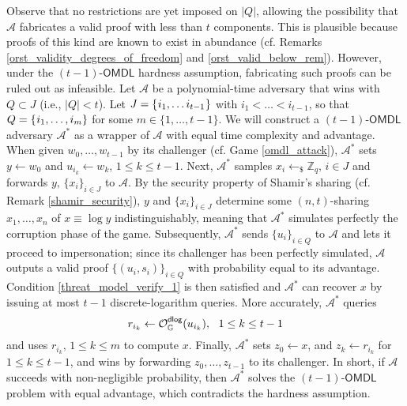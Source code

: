 \documentclass[psamsfonts, reqno]{amsart}
\theoremstyle{definition}
\theoremstyle{remark}
\numberwithin{equation}{section}
\begin{document}
Observe that no restrictions are yet imposed on $|Q|$,
allowing the possibility that $\mathcal{A}$ fabricates
a valid proof with less than $t$ components.
This is plausible because proofs of this kind
are known to exist in abundance
(cf. Remarks \ref{orst_validity_degrees_of_freedom}
and \ref{orst_valid_below_rem}).
However, under the $(t-1)$-$\mathsf{OMDL}$ hardness assumption,
fabricating such proofs can be ruled out as infeasible.
Let $\mathcal{A}$ be a polynomial-time adversary
that wins with $Q \subset J$ (i.e., $|Q| < t$).
Let $J = \{\hspace{0.5pt}i_1, \dots i_{t-1}\hspace{0.5pt}\}$
with $i_1 < \dots < i_{t-1}$,
so that
$Q = \{\hspace{0.5pt}i_1, \dots, i_m\}$
for some $m \in \{1, \dots, t-1\}$.
We will construct a $(t-1)$-$\mathsf{OMDL}$ adversary
$\mathcal{A}^*$ as a wrapper of $\mathcal{A}$
with equal time complexity and advantage.
When given $w_0, \dots, w_{t-1}$ by its challenger
(cf. Game \ref{omdl_attack}),
$\mathcal{A}^*$ sets $y \leftarrow w_0$ and
$u_{i_k} \leftarrow w_k,\hspace{2pt} 1 \le k \le t-1$.
Next, $\mathcal{A}^*$ samples
$x_i \leftarrow_\$ \mathbb{Z}_q,\hspace{2pt} i \in J$
and forwards $y,\hspace{2pt} \{x_i\}_{i \in J}$ to $\mathcal{A}$.
By the security property of Shamir's sharing
(cf. Remark \ref{shamir_security}),
$y$ and $\{x_i\}_{i \in J}$
determine some $(n, t)$-sharing $x_1, \dots, x_n$
of $x \equiv \log y$
indistinguishably, meaning that $\mathcal{A}^*$
simulates perfectly the corruption phase of the game.
Subsequently, $\mathcal{A}^*$ sends $\{u_i\}_{i \in Q}$ to $\mathcal{A}$
and lets it proceed to impersonation;
since its challenger has been perfectly simulated,
$\mathcal{A}$ outputs a valid proof $\{(u_i, s_i)\}_{i \in Q}$
with probability equal to its advantage.
Condition \eqref{threat_model_verify_1}
is then satisfied and $\mathcal{A}^*$ can recover $x$ by issuing
at most $t-1$ discrete-logarithm queries.
More accurately, $\mathcal{A}^*$ queries
\vspace{5pt}
\begin{equation*}
r_{i_k} \leftarrow \mathcal{O}_{\mathbb{G}}^{\mathsf{dlog}}(u_{i_k}),
\ \ 1 \le k \le t-1
\vspace{5pt}
\end{equation*}
and uses $r_{i_k},\hspace{2pt} 1 \le k \le m$ to compute $x$.
Finally,
$\mathcal{A}^*$ sets $z_0 \leftarrow x$,
and $z_k \leftarrow r_{i_k}$ for $1 \le k \le t-1$,
and wins by forwarding
$z_0, \dots, z_{t-1}$ to its challenger.
In short, if $\mathcal{A}$ succeeds
with non-negligible probability, then $\mathcal{A}^*$
solves the $(t-1)$-$\mathsf{OMDL}$ problem with equal advantage,
which contradicts the hardness assumption.
\end{document}

